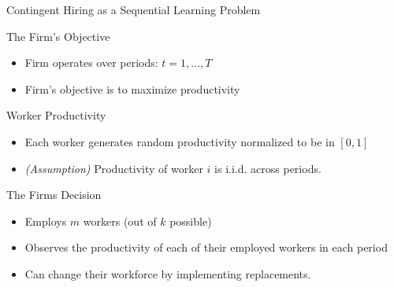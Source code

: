 \documentclass[10pt,aspectratio=169]{beamer}
\begin{document}
\begin{frame}{Contingent Hiring as a Sequential Learning Problem}
    \begin{block}{The Firm's Objective}
    \begin{itemize}
        \item Firm operates over periods: \(t=1,\dots, T\)
        \item Firm's objective is to \alert{maximize productivity}
    \end{itemize} 
    \end{block}

    \begin{block}{Worker Productivity}
    \begin{itemize}
        \item Each worker generates random productivity normalized to be in \([0,1]\)
        \item \emph{(Assumption)} Productivity of worker \(i\) is i.i.d. across periods.
    \end{itemize} 
    \end{block}

    \begin{block}{The Firms Decision}
    \begin{itemize}
        \item Employs \(m\) workers (out of \(k\) possible)
        \item Observes the productivity of each of their employed workers in each period
        \item Can change their workforce by implementing \alert{replacements}.
    \end{itemize} 
    \end{block}
    
\end{frame}
\end{document}
